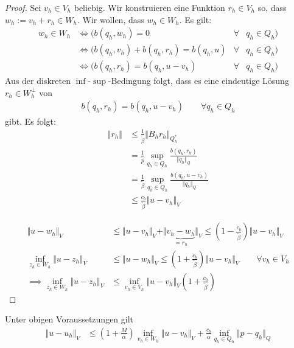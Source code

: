 \begin{proof}
	Sei $v_h\in V_h$ beliebig.
	Wir konstruieren eine Funktion $r_h\in V_h$ so, dass $w_h:=v_h+r_h\in W_h$.
	Wir wollen, dass $w_h\in W_h$.
	Es gilt:
	\begin{align*}
		w_h\in W_h
		&\Longleftrightarrow \Big(b(q_h,w_h)=0\qquad&\forall& q_h\in Q_h\Big)\\
		&\Longleftrightarrow \Big(b(q_h,v_h)+b(q_h,r_h)=b(q_h,u) &\forall&q_h\in Q_h\Big)\\
		&\Longleftrightarrow\Big( b(q_h,r_h)=b(q_h,u-v_h) &\forall&q_h\in Q_h\Big)
	\end{align*}
	Aus der diskreten $\inf$-$\sup$-Bedingung folgt, dass es eine eindeutige Lösung $r_h\in W_h^\perp$ von
	\begin{align*}
		b(q_h,r_h)=b(q_h,u-v_h)\qquad\forall q_h\in Q_h
	\end{align*}
	gibt. Es folgt:
	\begin{align*}
		\Vert r_h\Vert&\leq\frac{1}{\tilde{\beta}}\Vert B_h r_h\Vert_{Q_h^\ast}\\
		&=\frac{1}{\tilde{p}}\sup\limits_{q_h\in Q_h}\frac{b(q_h,r_h)}{\Vert q_h\Vert_Q}\\
		&=\frac{1}{\tilde{\beta}}\sup\limits_{q_h\in Q_h}\frac{b(q_h,u-v_h)}{\Vert q_h\Vert_Q}\\
		&\leq\frac{c_b}{\tilde{\beta}}\Vert u-v_h\Vert_V
	\end{align*}
	
	\begin{align*}
		\Vert u-w_h\Vert_V
		&\leq\Vert u-v_h\Vert_V+\Vert\underbrace{v_h-w_h}_{=r_h}\Vert_V
		\leq\left(1-\frac{c_b}{\tilde{\beta}}\right)\Vert u-v_h\Vert_V\\
		\inf\limits_{z_h\in W_h}\Vert u-z_h\Vert_V
		&\leq\Vert u-w_h\Vert_V
		\leq\left(1+\frac{c_b}{\tilde{\beta}}\right)\Vert u-v_h\Vert_V\qquad\forall v_h\in V_h\\
		\implies
		\inf\limits_{z_h\in W_h}\Vert u-z_h\Vert_V
		&\leq\inf\limits_{v_h\in V_h}\Vert u-v_h\Vert_V\left(1+\frac{c_b}{\tilde{\beta}}\right)
	\end{align*}
\end{proof}

\begin{theorem} %
	Unter obigen Voraussetzungen gilt
	\begin{align*}
		\Vert u-u_h\Vert_V&\leq\left(1+\frac{M}{\alpha}\right)\inf\limits_{v_h\in W_h}\Vert u-v_h\Vert_V+\frac{c_b}{\alpha}\inf\limits_{q_h\in Q_h}\Vert p-q_h\Vert_Q
	\end{align*}
\end{theorem}

